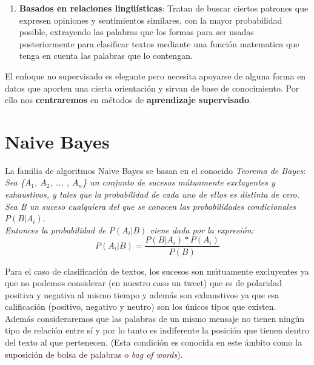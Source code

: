 \documentclass[a4paper,12pt]{report}
\begin{document}
\begin{enumerate}
\begin{enumerate}
	\item \textbf{Basados en relaciones lingüísticas}: Tratan de buscar ciertos patrones que expresen opiniones y sentimientos similares, con la mayor probabilidad posible, extrayendo las palabras que los formas para ser usadas posteriormente para clasificar textos mediante una función matematica que tenga en cuenta las palabras que lo contengan. 

	\end{enumerate}

\end{enumerate}

El enfoque no supervisado es elegante pero necesita apoyarse de alguna forma en datos que aporten una cierta orientación y sirvan de base de conocimiento. Por ello nos \textbf{centraremos} en métodos de \textbf{aprendizaje supervisado}.

\vspace{6mm}
\section{Naive Bayes}

La familia de algoritmos Naive Bayes se basan en el conocido \textit{Teorema de Bayes}: \\

\textit{Sea \{$A_1$, $A_2$, ... , $A_n$\} un conjunto de sucesos mútuamente excluyentes y exhaustivos, y tales que la probabilidad de cada uno de ellos es distinta de cero. Sea B un suceso cualquiera del que se conocen las probabilidades condicionales $P(B|A_i)$.
\vspace{2mm}\\
Entonces la probabilidad de $P(A_i |B)$ viene dada por la expresión:}
\vspace{4mm}
\[ P(A_i | B) = \frac{P(B|A_i) * P(A_i)}{P(B)}  \]

\vspace{4mm}
Para el caso de clasificación de textos, los sucesos son mútuamente excluyentes ya que no podemos considerar (en nuestro caso un tweet) que es de polaridad positiva y negativa al mismo tiempo y además son exhaustivos ya que esa calificación (positivo, negativo y neutro) son los únicos tipos que existen. 
\vspace{2mm}\\
Además consideraremos que las palabras de un mismo mensaje no tienen ningún tipo de relación entre sí y por lo tanto es indiferente la posición que tienen dentro del texto al que pertenecen. (Esta condición es conocida en este ámbito como la suposición de bolsa de palabras o \textit{bag of words}). 
\end{document}
